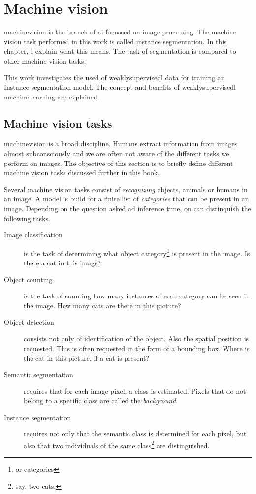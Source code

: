 \chapter{Machine vision}

\Gls{machinevision} is the branch of \Gls{ai} focussed on image processing.
The machine vision task performed in this work is called instance \Gls{segmentation}.
In this chapter, I explain what this means. 
The task of segmentation is compared to other machine vision tasks.

This work investigates the used of \Gls{weaklysupervisedl} data for training an Instance segmentation model. 
The concept and benefits of \Gls{weaklysupervisedl} machine learning are explained.

\section{Machine vision tasks \label{sec:machinevisiontasks}}

\Gls{machinevision} is a broad discipline. 
Humans extract information from images almost subconsciously and we are often not aware of the different tasks we perform on images.
The objective of this section is to briefly define different machine vision tasks discussed further in this book. 


Several machine vision tasks consist of \textit{recognizing} objects, animals or humans in an image.
A model is build for a finite list of \textit{categories} that can be present in an image.
Depending on the question asked ad inference time, on can distinquish the following tasks.

\begin{description}
    \item[Image classification] is the task of determining what object category\footnote{or categories} is present in the image. Is there a cat in this image?
    \item[Object counting] is the task of counting how many instances of each category can be seen in the image. How many cats are there in this picture? 
    \item[Object detection] consists not only of identification of the object. Also the spatial position is requested. This is often requested in the form of a bounding box. Where is the cat in this picture, if a cat is present?
    \item[Semantic segmentation] requires that for each image pixel, a class is estimated. Pixels that do not belong to a specific class are called the \textit{background}.
    \item[Instance segmentation] requires not only that the semantic class is determined for each pixel, but also that two individuals of the same class\footnote{say, two cats.} are distinguished.   
\end{description}

